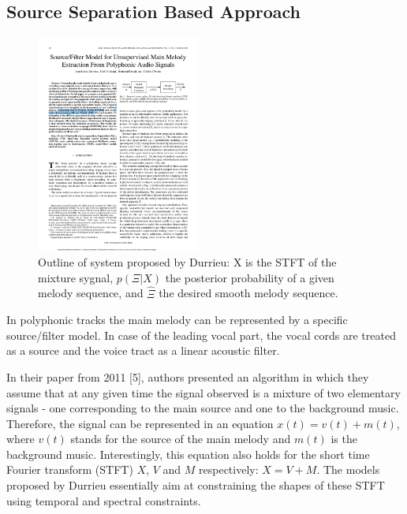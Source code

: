 \subsection{Source Separation Based Approach}

\begin{figure}
  \vspace{-50pt}

  \begin{center}
    \includegraphics[width=0.48\textwidth]{Figures/durrieudiagram}
  \end{center}
  \caption{Outline of system proposed by Durrieu: X is the STFT of the mixture sygnal, $p(\Xi|X)$ the posterior probability of a given melody sequence, and $\hat{\Xi} $ the desired smooth melody sequence.}
\end{figure}


In polyphonic tracks the main melody can be represented by a specific source/filter model. In case of the leading vocal part, the vocal cords are treated as a source and the voice tract as a linear acoustic filter.

In their paper from 2011 [5], authors presented an algorithm in which they assume that at any given time the signal observed is a mixture of two elementary signals - one corresponding to the main source and one to the background music. Therefore, the signal can be represented in an equation $x(t) = v(t) + m(t)$, where $v(t)$ stands for the source of the main melody and $m(t)$ is the background music. Interestingly, this equation also holds for the short time Fourier transform (STFT)  $X$, $V$ and $M$ respectively: $X = V + M$. The models proposed by Durrieu essentially aim at constraining the shapes of these STFT using temporal and spectral constraints. 



